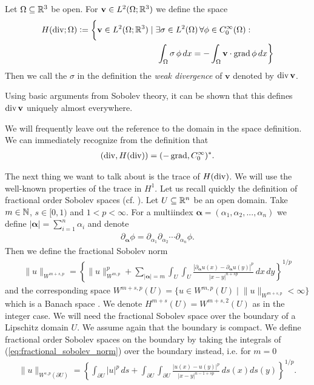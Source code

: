 \documentclass[../master_thesis.tex]{subfiles}
\begin{document}
\begin{definition}
    Let $\Omega \subseteq \mathbb{R}^3$ be open. For $\mathbf{v} \in L^2(\Omega;\mathbb{R}^3)$ we  
    define the space
    \begin{align*}
        H(\operatorname{div};\Omega) \vcentcolon= \bigg\{ \mathbf{v} \in L^2(\Omega;\mathbb{R}^3) &\mid
            \exists \sigma \in L^2(\Omega)\, \forall \phi \in C_0^\infty(\Omega) :  
            \\ &\quad\int_\Omega \sigma \, \phi \, dx = -\int_\Omega \mathbf{v} \cdot \operatorname{grad} \phi \, dx \bigg\}
    \end{align*}
    Then we call the $\sigma$ in the definition the \textit{weak divergence} of $\mathbf{v}$
    denoted by $\operatorname{div} \mathbf{v}$.
\end{definition}
Using basic arguments from Sobolev theory, it can be shown that this defines $\operatorname{div} \mathbf{v}$ 
uniquely almost everywhere. 


We will frequently leave out the reference to the domain in the space definition.
We can immediately recognize from the definition that 
\begin{align}
    (\operatorname{div}, H(\operatorname{div})) = (-\operatorname{grad}, C_0^\infty)^*. \label{eq:adjoint_grad_c0inf}
\end{align}

The next thing we want to talk about is the trace of $H(\operatorname{div})$. 
We will use the well-known properties of the trace in $H^1$. 
Let us recall 
quickly the definition of fractional order Sobolev spaces (cf. \cite[Sec.\,3.2]{monk}). Let 
$U \subseteq \mathbb{R}^n$ be an open domain. Take $m \in \mathbb{N}$, 
$s \in [0, 1)$ and $1 < p < \infty$. For a multiindex $\boldsymbol{\alpha} = 
(\alpha_1, \alpha_2, ..., \alpha_n)$ we define $|\boldsymbol{\alpha}| = \sum_{i=1}^n \alpha_i$ 
and denote 
\begin{align}
    \partial_{\bm{\alpha}} \phi = 
    \partial_{\alpha_1} \partial_{\alpha_2} \cdots \partial_{\alpha_n} \phi.
\end{align}
Then we define the fractional Sobolev norm
\begin{align}
    \lVert u \rVert _ {W^{m+s, p}} = \left\{ \lVert u \rVert ^p_{W^{m, p}} + 
        \sum_{|\bm{\alpha}|=m} \int_U \int_U 
        \frac{|\partial_{\bm{\alpha}} u(x) - \partial_{\bm{\alpha}} u(y)|^p}
        {|x - y|^{n+sp}} \, dx \,dy\right\}^{1/p}\label{eq:fractional_sobolev_norm}
\end{align}
and the corresponding space $W^{m+s, p}(U) = \{ u \in W^{m,p}(U) \mid \lVert u \rVert _{W^{m+s, p}} < \infty \}$ 
which is a Banach space \cite[p.42]{monk}. We denote 
$H^{m+s}(U) = W^{m+s, 2}(U)$ as in the integer case. We will need the 
fractional Sobolev space over the boundary of a Lipschitz domain $U$. We assume 
again that the boundary is compact.
We define fractional order Sobolev spaces on the boundary by taking the integrals of (\ref{eq:fractional_sobolev_norm}) 
over the boundary instead, i.e. for $m = 0$
\begin{align*}
    \lVert u \rVert _{W^{s, p}(\partial U)} = \left\{ \int_{\partial U} |u|^p \, ds + 
        \int_{\partial U} \int_{\partial U}
        \frac{|u(x) - u(y)|^p}
        {|x - y|^{n-1+sp}} \, ds(x) ds(y)\right\}^{1/p}.
\end{align*}
\end{document}
